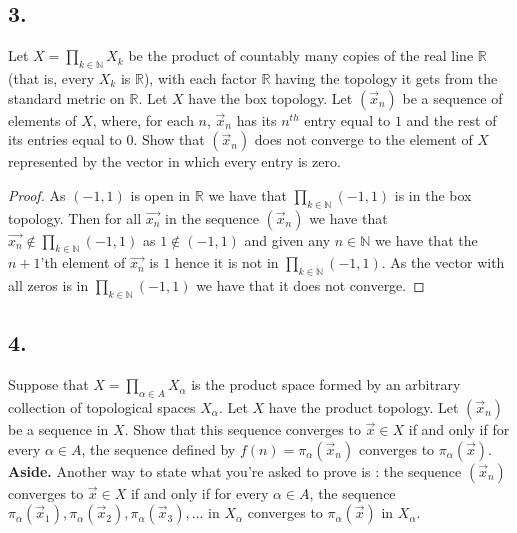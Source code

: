 \documentclass{amsart}
\theoremstyle{plain}
\theoremstyle{definition}
\theoremstyle{remark}
\begin{document}
\vspace{.15in}

\noindent
\subsection*{3.} Let $X =\prod _{k\in \mathbb N} X_k$ be the product of countably many copies of the real line $\mathbb R$  (that is, every $X_k$ is $\mathbb R$), with each factor $\mathbb R$ having the topology it gets from the standard metric on $\mathbb R$. Let $X$ have the box topology. Let $(\vec{x}_n)$ be a sequence of elements of $X$, where, for each $n$, $\vec{x}_n$ has its $n^{th}$ entry equal to $1$ and the rest of its entries equal to $0$.  Show that $(\vec{x}_n)$ does not converge to the element of $X$ represented by the vector in which every entry is zero. 

\begin{proof}

    As $(-1,1)$ is open in $\mathbb{R}$ we have that $\prod_{k\in \mathbb{N}}(-1,1)$ is in the box topology. Then for all $\vec{x_n}$ in the sequence $(\vec x_n)$ we have that $\vec{x_n}\not \in \prod_{k\in \mathbb{N}}(-1,1)$ as $1\not \in (-1,1)$ and given any $n\in \mathbb{N}$ we have that the $n+1$'th element of $\vec{x_n}$ is $1$ hence it is not in $\prod_{k\in \mathbb{N}}(-1,1)$. As the vector with all zeros is in $\prod_{k\in \mathbb{N}}(-1,1)$ we have that it does not converge.

    
\end{proof}



\vspace{.15in}

\noindent
\subsection*{4.} Suppose that  $X = \prod _{\alpha \in A} X_{\alpha}$ is the product space formed by an arbitrary collection of topological spaces $X_{\alpha}$. Let $X$ have the product topology. Let $(\vec{x}_n)$ be a sequence in $X$. Show that this sequence converges to $\vec{x} \in X$ if and only if for every $\alpha \in A$, the sequence defined by $f(n) = \pi _{\alpha} (\vec{x}_n)$ converges to $ \pi _{\alpha} (\vec{x})$. {\bfseries Aside.} Another way to state what you're asked to prove is : the sequence $(\vec{x}_n)$ converges to $\vec{x} \in X$ if and only if for every $\alpha \in A$, the sequence $\pi _{\alpha} (\vec{x}_1) , \pi _{\alpha} (\vec{x}_2), \pi _{\alpha} (\vec{x}_3) , . . . $ in $X_{\alpha}$ converges to $ \pi _{\alpha} (\vec{x})$ in $X_{\alpha}$.
\end{document}
